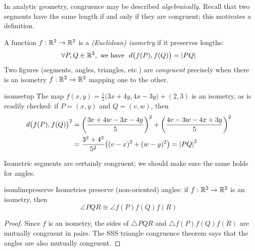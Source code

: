 In analytic geometry, congruence may be described \emph{algebraically.} Recall that two segments have the same length if and only if they are congruent; this motivates a definition.

\begin{defn}{}{}
A function $f:\mathbb{R}^2\to\mathbb{R}^2$ is a \emph{(Euclidean) isometry\footnotemark} if it preserves lengths:
\[\forall P,Q\in\R^2,\text{ we have }\ d\bigl(f(P),f(Q)\bigr)=\nm{PQ}\]
Two figures (segments, angles, triangles, etc.) are \emph{congruent} precisely when there is an isometry $f:\mathbb{R}^2\to\mathbb{R}^2$ mapping one to the other.
\end{defn}



\begin{example}{}{isomsetup}
The map $f(x,y)=\frac 15\bigl(3x+4y,4x-3y\bigr)+(2,3)$ is an isometry, as is readily checked: if $P=(x,y)$ and $Q=(v,w)$, then
\begin{align*}
d\bigl(f(P),f(Q)\bigr)^2&=\left(\frac{3v+4w-3x-4y}5\right)^2+\left(\frac{4v-3w-4x+3y}5\right)^2\\
&=\frac{3^2+4^2}{5^2}\bigl((v-x)^2+(w-y)^2\bigr) =\left| PQ\right|^2
\end{align*}
\end{example}

Isometric segments are certainly congruent; we should make sure the same holds for angles.

\begin{lemm}{}{isomlinepreserve}
Isometries preserve (non-oriented) angles: if $f:\mathbb{R}^2\to\mathbb{R}^2$ is an isometry, then
  \[\angle PQR\cong \angle f(P)f(Q)f(R)\]
\end{lemm}

\begin{proof}
Since $f$ is an isometry, the sides of $\triangle PQR$ and $\triangle f(P)f(Q)f(R)$ are mutually congruent in pairs. The SSS triangle congruence theorem says that the angles are also mutually congruent.%
\end{proof}

